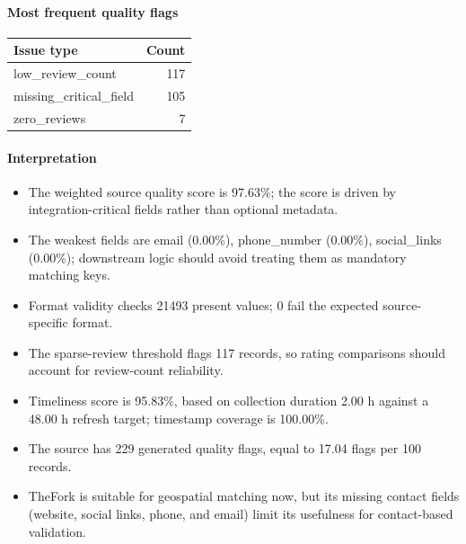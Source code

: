 \paragraph{Most frequent quality flags}
\begin{tabular}{lr}
\toprule
Issue type & Count \\
\midrule
low\_review\_count & 117 \\
missing\_critical\_field & 105 \\
zero\_reviews & 7 \\
\bottomrule
\end{tabular}

\paragraph{Interpretation}
\begin{itemize}
\item The weighted source quality score is 97.63\%; the score is driven by integration-critical fields rather than optional metadata.
\item The weakest fields are email (0.00\%), phone\_number (0.00\%), social\_links (0.00\%); downstream logic should avoid treating them as mandatory matching keys.
\item Format validity checks 21493 present values; 0 fail the expected source-specific format.
\item The sparse-review threshold flags 117 records, so rating comparisons should account for review-count reliability.
\item Timeliness score is 95.83\%, based on collection duration 2.00 h against a 48.00 h refresh target; timestamp coverage is 100.00\%.
\item The source has 229 generated quality flags, equal to 17.04 flags per 100 records.
\item TheFork is suitable for geospatial matching now, but its missing contact fields (website, social links, phone, and email) limit its usefulness for contact-based validation.
\end{itemize}
